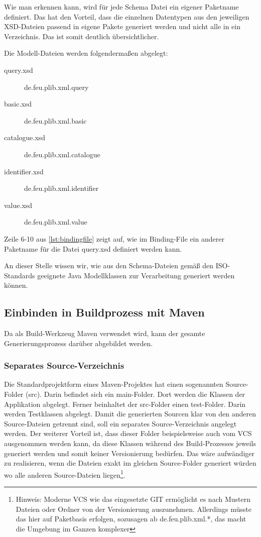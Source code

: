 Wie man erkennen kann, wird für jede Schema Datei ein eigener Paketname definiert. Das hat den Vorteil, dass die einzelnen Datentypen aus den jeweiligen XSD-Dateien passend in eigene Pakete generiert werden und nicht alle in ein Verzeichnis. Das ist somit deutlich übersichtlicher. 

Die Modell-Dateien werden folgendermaßen abgelegt:

\begin{description}
\item[query.xsd] de.feu.plib.xml.query
\item[basic.xsd] de.feu.plib.xml.basic
\item[catalogue.xsd] de.feu.plib.xml.catalogue
\item[identifier.xsd] de.feu.plib.xml.identifier
\item[value.xsd] de.feu.plib.xml.value
\end{description}

Zeile 6-10 aus \autoref{lst:bindingfile} zeigt auf, wie im Binding-File ein anderer Paketname für die Datei query.xsd definiert werden kann. 

An dieser Stelle wissen wir, wie aus den Schema-Dateien gemäß den ISO-Standards geeignete Java Modellklassen zur Verarbeitung generiert werden können. 

\subsection{Einbinden in Buildprozess mit Maven}
Da als Build-Werkzeug \gls{Maven} verwendet wird, kann der gesamte Generierungsprozess darüber abgebildet werden. 

\subsubsection{Separates Source-Verzeichnis}
Die Standardprojektform eines \gls{Maven}-Projektes hat einen sogenannten Source-Folder (src). Darin befindet sich ein main-Folder. Dort werden die Klassen der Applikation abgelegt. Ferner beinhaltet der src-Folder einen test-Folder. Darin werden Testklassen abgelegt. 
Damit die generierten Sourcen klar von den anderen Source-Dateien getrennt sind, soll ein separates Source-Verzeichnis angelegt werden. Der weiterer Vorteil ist, dass dieser Folder beispielsweise auch vom \gls{VCS} ausgenommen werden kann, da diese Klassen während des Build-Prozesses jeweils generiert werden und somit keiner Versionierung bedürfen. Das wäre aufwändiger zu realisieren, wenn die Dateien exakt im gleichen Source-Folder generiert würden wo alle anderen Source-Dateien liegen\footnote{Hinweis: Moderne \gls{VCS} wie das eingesetzte GIT ermöglicht es nach Mustern Dateien oder Ordner von der Versionierung auszunehmen. Allerdings müsste das hier auf Paketbasis erfolgen, sozusagen ab de.feu.plib.xml.*, das macht die Umgebung im Ganzen komplexer}. 

